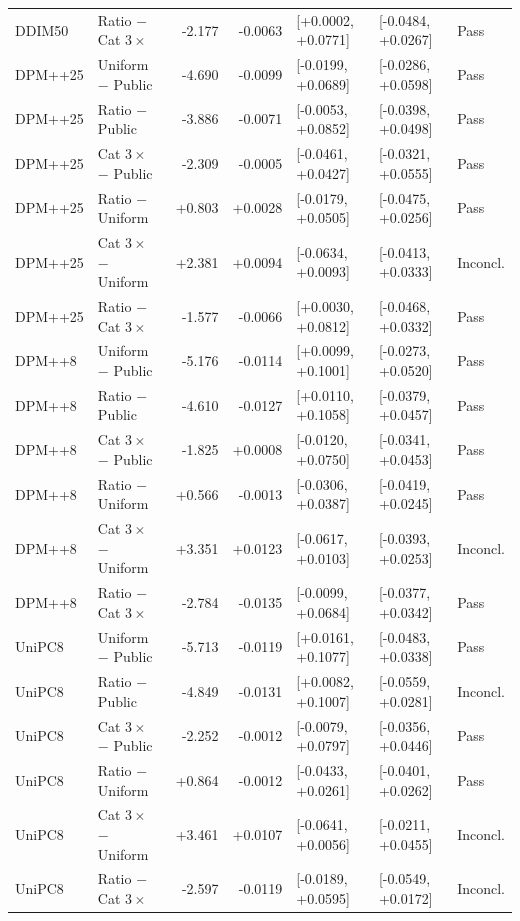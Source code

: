 \begin{table}[t]
\begin{tabular}{llrrlll}
DDIM50 & Ratio $-$ Cat $3\times$ & -2.177 & -0.0063 & [+0.0002, +0.0771] & [-0.0484, +0.0267] & Pass \\
DPM++25 & Uniform $-$ Public & -4.690 & -0.0099 & [-0.0199, +0.0689] & [-0.0286, +0.0598] & Pass \\
DPM++25 & Ratio $-$ Public & -3.886 & -0.0071 & [-0.0053, +0.0852] & [-0.0398, +0.0498] & Pass \\
DPM++25 & Cat $3\times$ $-$ Public & -2.309 & -0.0005 & [-0.0461, +0.0427] & [-0.0321, +0.0555] & Pass \\
DPM++25 & Ratio $-$ Uniform & +0.803 & +0.0028 & [-0.0179, +0.0505] & [-0.0475, +0.0256] & Pass \\
DPM++25 & Cat $3\times$ $-$ Uniform & +2.381 & +0.0094 & [-0.0634, +0.0093] & [-0.0413, +0.0333] & Inconcl. \\
DPM++25 & Ratio $-$ Cat $3\times$ & -1.577 & -0.0066 & [+0.0030, +0.0812] & [-0.0468, +0.0332] & Pass \\
DPM++8 & Uniform $-$ Public & -5.176 & -0.0114 & [+0.0099, +0.1001] & [-0.0273, +0.0520] & Pass \\
DPM++8 & Ratio $-$ Public & -4.610 & -0.0127 & [+0.0110, +0.1058] & [-0.0379, +0.0457] & Pass \\
DPM++8 & Cat $3\times$ $-$ Public & -1.825 & +0.0008 & [-0.0120, +0.0750] & [-0.0341, +0.0453] & Pass \\
DPM++8 & Ratio $-$ Uniform & +0.566 & -0.0013 & [-0.0306, +0.0387] & [-0.0419, +0.0245] & Pass \\
DPM++8 & Cat $3\times$ $-$ Uniform & +3.351 & +0.0123 & [-0.0617, +0.0103] & [-0.0393, +0.0253] & Inconcl. \\
DPM++8 & Ratio $-$ Cat $3\times$ & -2.784 & -0.0135 & [-0.0099, +0.0684] & [-0.0377, +0.0342] & Pass \\
UniPC8 & Uniform $-$ Public & -5.713 & -0.0119 & [+0.0161, +0.1077] & [-0.0483, +0.0338] & Pass \\
UniPC8 & Ratio $-$ Public & -4.849 & -0.0131 & [+0.0082, +0.1007] & [-0.0559, +0.0281] & Inconcl. \\
UniPC8 & Cat $3\times$ $-$ Public & -2.252 & -0.0012 & [-0.0079, +0.0797] & [-0.0356, +0.0446] & Pass \\
UniPC8 & Ratio $-$ Uniform & +0.864 & -0.0012 & [-0.0433, +0.0261] & [-0.0401, +0.0262] & Pass \\
UniPC8 & Cat $3\times$ $-$ Uniform & +3.461 & +0.0107 & [-0.0641, +0.0056] & [-0.0211, +0.0455] & Inconcl. \\
UniPC8 & Ratio $-$ Cat $3\times$ & -2.597 & -0.0119 & [-0.0189, +0.0595] & [-0.0549, +0.0172] & Inconcl. \\
\bottomrule
\end{tabular}
\end{table}

